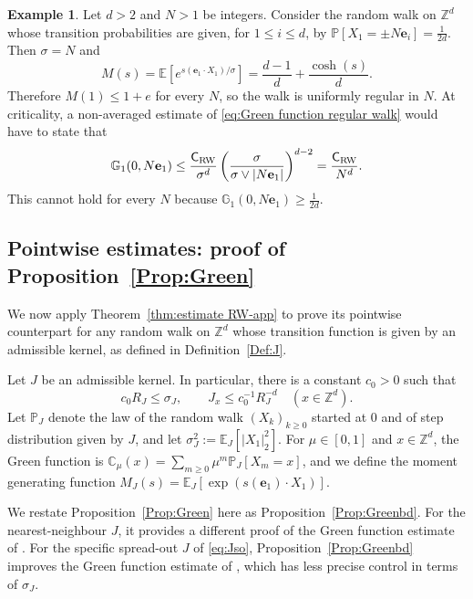 \documentclass[11pt,a4paper]{article}
\numberwithin{equation}{section}
\theoremstyle{plain}
\theoremstyle{definition}
\newtheorem{Ex}[Thm]{Example}
\newcommand\1{\mathds{1}}
\newcommand\Crw{\mathsf{C}_{\textup{RW}}}
\begin{document}
\begin{Ex}
\label{ex:rw}
Let $d>2$ and $N >1$ be integers.
Consider the random walk on $\mathbb Z^d$ whose transition probabilities are given, for $1\leq i \leq d$, by
$\mathbb P[X_1=\pm N\mathbf{e}_i ]=\frac{1}{2d}$.
Then  $\sigma=N$ and
\begin{equation}
    M(s) = \mathbb E[e^{s (\mathbf{e}_1\cdot X_1)/\sigma}] = \frac{d-1}{d}+ \frac{\cosh(s)}{d} .
\end{equation}
Therefore $M(1) \le 1+e$ for every $N$, so the
walk is uniformly regular in $N$.
At criticality,
a non-averaged estimate of \eqref{eq:Green function regular walk} would have
to state that
\begin{equation}
	\mathbb G_1(0,N\mathbf{e}_1)
    \leq \frac{\Crw}{\sigma^d}\left(\frac{\sigma}{\sigma \vee |N\mathbf{e}_1|}\right)^{d-2}
    =
    \frac{\Crw}{N^d}.
\end{equation}
This cannot hold for every $N$ because
$\mathbb G_1(0, N\mathbf{e}_1)\geq \frac{1}{2d}$.
\end{Ex}

\subsection{Pointwise estimates: proof of Proposition~\ref{Prop:Green}}
\label{sec:Green-pointwise}

We now apply Theorem~\ref{thm:estimate RW-app} to prove its pointwise counterpart
for any random walk on $\mathbb Z^d$ whose transition function is given by
an admissible kernel, as defined in Definition~\ref{Def:J}.

Let $J$ be an admissible kernel.
In particular, there is a constant $c_0>0$ such that
\begin{equation}\label{eq: new req J}
    c_0R_J \le \sigma_J,
    \qquad
    J_{x} \le c_0^{-1}R_J^{-d} \quad (x\in \mathbb Z^d).
\end{equation}
Let $\mathbb P_J$ denote the law of the random walk $(X_k)_{k\geq 0}$ started at $0$ and of step distribution given by $J$, and let $\sigma_J^2:=\mathbb E_J[|X_1|_2^2]$. For $\mu\in [0,1]$ and $x\in \mathbb Z^d$, the Green
function is $\mathbb C_\mu(x)=\sum_{m\geq 0}\mu^m \mathbb P_J[X_m=x]$, and we
define the moment generating function $M_J(s)=\mathbb E_J[\exp(s(\mathbf{e}_1)\cdot X_1 )]$.

We restate Proposition~\ref{Prop:Green} here as Proposition~\ref{Prop:Greenbd}.
For the nearest-neighbour $J$, it provides a different proof of the Green function
estimate of \cite[Proposition~2.1]{Slad23_wsaw}.
For the specific spread-out $J$ of \eqref{eq:Jso},
Proposition~\ref{Prop:Greenbd} improves the Green function estimate of
\cite[Proposition~B.1]{LS25a},  which
has less precise control in terms of $\sigma_J$.
\end{document}
